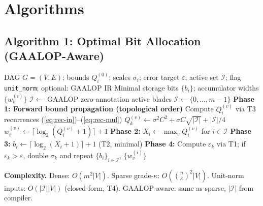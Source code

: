 \documentclass[11pt,a4paper]{article}
\theoremstyle{definition}
\theoremstyle{plain}
\theoremstyle{remark}
\begin{document}
\section{Algorithms}
\label{sec:algo}

\subsection{Algorithm 1: Optimal Bit Allocation (GAALOP-Aware)}

\begin{algorithm}[H]
\caption{Optimal Bit Allocation for any SCA product (dense/sparse/constrained/compiler-aware)}
\label{alg:bitalloc}
\begin{algorithmic}[1]
\REQUIRE DAG $G=(V,E)$; bounds $Q_i^{(0)}$; scales $\sigma_i$; error target $\varepsilon$;
         active set $\mathcal{I}$; flag \texttt{unit\_norm}; optional: GAALOP IR
\ENSURE Minimal storage bits $\{b_i\}$; accumulator widths $\{w_v^{(i)}\}$
  \STATE $\mathcal{I}\leftarrow$ GAALOP zero-annotation active blades
  \STATE $\mathcal{I}\leftarrow\{0,\ldots,m-1\}$
\ENDIF
\STATE \textbf{Phase 1: Forward bound propagation (topological order)}
  \STATE Compute $Q_i^{(v)}$ via T3 recurrences (\ref{eq:rec-in})--(\ref{eq:rec-mul})
    \STATE $Q_k^{(v)}\leftarrow\sigma^2C^2+\sigma C\sqrt{|\mathcal{I}|}+|\mathcal{I}|/4$
  \ENDIF
  \STATE $w_i^{(v)}\leftarrow\lceil\log_2(Q_i^{(v)}+1)\rceil+1$
\ENDFOR
\STATE \textbf{Phase 2:} $X_i\leftarrow\max_v Q_i^{(v)}$ for $i\in\mathcal{I}$
\STATE \textbf{Phase 3:} $b_i\leftarrow\lceil\log_2(X_i+1)\rceil+1$ (T2, minimal)
\STATE \textbf{Phase 4:} Compute $\varepsilon_k$ via T1; if $\varepsilon_k>\varepsilon$, double $\sigma_k$ and repeat
\RETURN $\{b_i\}_{i\in\mathcal{I}}$, $\{w_v^{(i)}\}$
\end{algorithmic}
\end{algorithm}

\textbf{Complexity.}
Dense: $O(m^2|V|)$.
Sparse grade-$\kappa$: $O(\binom{n}{\kappa}^2|V|)$.
Unit-norm inputs: $O(|\mathcal{I}||V|)$ (closed-form, T4).
GAALOP-aware: same as sparse, $|\mathcal{I}|$ from compiler.

\end{document}
